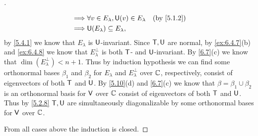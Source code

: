 \begin{proof}[]
\begin{itemize}
\begin{align*}
            \implies & \forall v \in E_{\lambda}, \U(v) \in E_{\lambda}         &  & \by{5.1.2}    \\
            \implies & \U(E_{\lambda}) \subseteq E_{\lambda},
          \end{align*}
          by \cref{5.4.1} we know that \(E_{\lambda}\) is \(\mathsf{U}\)-invariant.
          Since \(\mathsf{T}, \mathsf{U}\) are normal, by \cref{ex:6.4.7}(b) and \cref{ex:6.4.8} we know that \(E_{\lambda}^{\perp}\) is both \(\mathsf{T}\)- and \(\mathsf{U}\)-invariant.
          By \cref{6.7}(c) we know that \(\dim(E_{\lambda}^{\perp}) < n + 1\).
          Thus by induction hypothesis we can find some orthonormal bases \(\beta_1\) and \(\beta_2\) for \(E_{\lambda}\) and \(E_{\lambda}^{\perp}\) over \(\mathbb{C}\), respectively, consist of eigenvectors of both \(\mathsf{T}\) and \(\mathsf{U}\).
          By \cref{5.10}(d) and \cref{6.7}(c) we know that \(\beta = \beta_1 \cup \beta_2\) is an orthonormal basis for \(\mathsf{V}\) over \(\mathbb{C}\) consist of eigenvectors of both \(\mathsf{T}\) and \(\mathsf{U}\).
          Thus by \cref{5.2.8} \(\mathsf{T}, \mathsf{U}\) are simultaneously diagonalizable by some orthonormal bases for \(\mathsf{V}\) over \(\mathbb{C}\).
  \end{itemize}
  From all cases above the induction is closed.
\end{proof}
